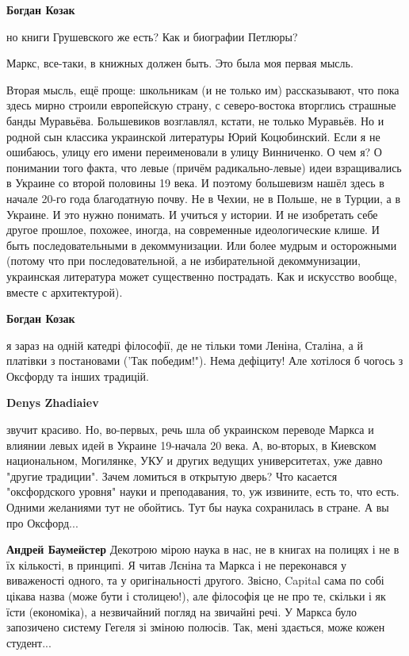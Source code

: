 \begin{itemize}
\begin{itemize} %
\textbf{Богдан Козак} 

но книги Грушевского же есть? Как и биографии Петлюры?

Маркс, все-таки, в книжных должен быть. Это была моя первая мысль. 

Вторая мысль, ещё проще: школьникам (и не только им) рассказывают, что пока
здесь мирно строили европейскую страну, с северо-востока вторглись страшные
банды Муравьёва. Большевиков возглавлял, кстати, не только Муравьёв. Но и
родной сын классика украинской литературы Юрий Коцюбинский. Если я не ошибаюсь,
улицу его имени переименовали в улицу Винниченко. О чем я? О понимании того
факта, что левые (причём радикально-левые) идеи взращивались в Украине со
второй половины 19 века. И поэтому большевизм нашёл здесь в начале 20-го года
благодатную почву. Не в Чехии, не в Польше, не в Турции, а в Украине. И это
нужно понимать.  И учиться у истории. И не изобретать себе другое прошлое,
похожее, иногда, на современные идеологические клише. И быть последовательными
в декоммунизации.  Или более мудрым и осторожными (потому что при
последовательной, а не избирательной декоммунизации, украинская литература
может существенно пострадать. Как и искусство вообще, вместе с архитектурой).

\textbf{Богдан Козак} 

я зараз на одній катедрі філософії, де не тільки томи
Леніна, Сталіна, а й платівки з постановами ('Так победим!"). Нема дефіциту!
Але хотілося б чогось з Оксфорду та інших традицій.


\textbf{Denys Zhadiaiev} 

звучит красиво. Но, во-первых, речь шла об украинском
переводе Маркса и влиянии левых идей в Украине 19-начала 20 века. А, во-вторых,
в Киевском национальном, Могилянке, УКУ и других ведущих университетах, уже
давно "другие традиции". Зачем ломиться в открытую дверь? Что касается
"оксфордского уровня" науки и преподавания, то, уж извините, есть то, что есть.
Одними желаниями тут не обойтись. Тут бы наука сохранилась в стране. А вы про
Оксфорд...

\textbf{Андрей Баумейстер} Декотрою мірою наука в нас, не в книгах на полицях і не в їх кількості, в принципі. Я читав Лєніна та Маркса і не переконався у виваженості одного, та у оригінальності другого. Звісно, Capital сама по собі цікава назва (може бути і столицею!), але філософія це не про те, скільки і як їсти (економіка), а незвичайний погляд на звичайні речі. У Маркса було запозичено систему Гегеля зі зміною полюсів. Так, мені здається, може кожен студент...


\end{itemize}
\end{itemize}
